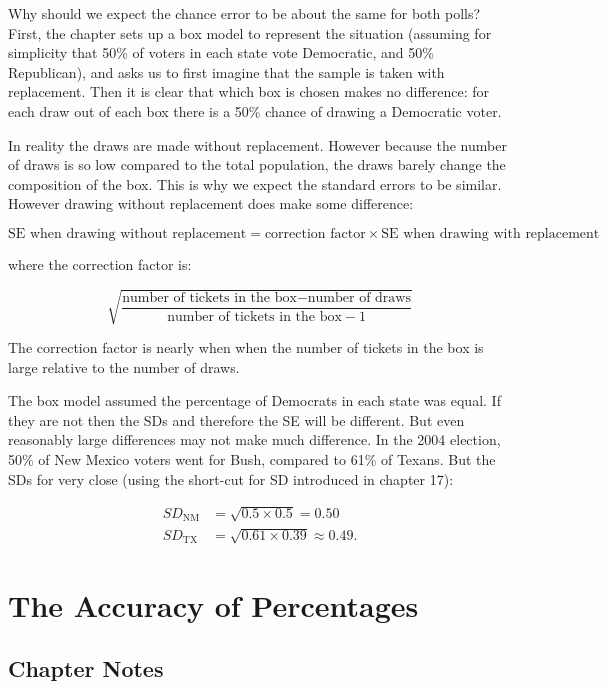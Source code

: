 \documentclass[
]{book}
\begin{document}
Why should we expect the chance error to be about the same for both polls? First, the chapter sets up a box model to represent the situation (assuming for simplicity that 50\% of voters in each state vote Democratic, and 50\% Republican), and asks us to first imagine that the sample is taken with replacement. Then it is clear that which box is chosen makes no difference: for each draw out of each box there is a 50\% chance of drawing a Democratic voter.

In reality the draws are made without replacement. However because the number of draws is so low compared to the total population, the draws barely change the composition of the box. This is why we expect the standard errors to be similar. However drawing without replacement does make some difference:

\[
\text{SE when drawing without replacement} = \text{correction factor} \times \text{SE when drawing with replacement}
\]

where the correction factor is:

\[
\sqrt{\frac{\text{number of tickets in the box} - \text{number of draws}}{\text{number of tickets in the box} - 1}}
\]

The correction factor is nearly when when the number of tickets in the box is large relative to the number of draws.

The box model assumed the percentage of Democrats in each state was equal. If they are not then the SDs and therefore the SE will be different. But even reasonably large differences may not make much difference. In the 2004 election, 50\% of New Mexico voters went for Bush, compared to 61\% of Texans. But the SDs for very close (using the short-cut for SD introduced in chapter 17):

\[
\begin{aligned}
SD_\text{NM} &= \sqrt{0.5 \times 0.5} = 0.50 \\
SD_\text{TX} &= \sqrt{0.61 \times 0.39} \approx 0.49.
\end{aligned}
\]

\hypertarget{accuracy_percentages}{%
\chapter{The Accuracy of Percentages}\label{accuracy_percentages}}

\hypertarget{chapter-notes-20}{%
\section{Chapter Notes}\label{chapter-notes-20}}
\end{document}

